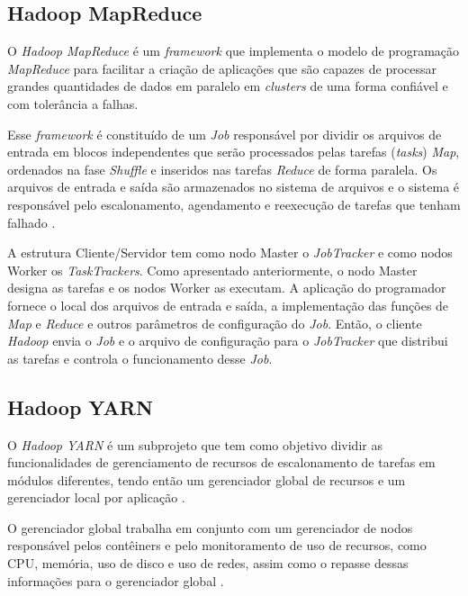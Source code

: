 \subsection{Hadoop MapReduce} \label{ssec:hadoopmapreduce}

O \textit{Hadoop MapReduce} é um \textit{\gls{framework}} que implementa o modelo de programação \textit{MapReduce} para facilitar a criação de aplicações que são capazes de processar grandes quantidades de dados em paralelo em \textit{clusters} de uma forma confiável e com tolerância a falhas. 

Esse \textit{\gls{framework}} é constituído de um \textit{Job} responsável por dividir os arquivos de entrada em blocos independentes que serão processados pelas tarefas (\textit{tasks}) \textit{Map}, ordenados na fase \textit{Shuffle} e inseridos nas tarefas \textit{Reduce} de forma paralela. Os arquivos de entrada e saída são armazenados no sistema de arquivos e o sistema é responsável pelo escalonamento, agendamento e reexecução de tarefas que tenham falhado \cite{HadoopMapReduce22}.

A estrutura Cliente/Servidor tem como nodo Master o \textit{JobTracker} e como nodos Worker os \textit{TaskTrackers}. Como apresentado anteriormente, o nodo Master designa as tarefas e os nodos Worker as executam. A aplicação do programador fornece o local dos arquivos de entrada e saída, a implementação das funções de \textit{Map} e \textit{Reduce} e outros parâmetros de configuração do \textit{Job}. Então, o cliente \textit{Hadoop} envia o \textit{Job} e o arquivo de configuração para o \textit{JobTracker} que distribui as tarefas e controla o funcionamento desse \textit{Job}.

\subsection{Hadoop YARN} \label{ssec:hadoopyarn}

O \textit{Hadoop YARN} é um subprojeto que tem como objetivo dividir as funcionalidades de gerenciamento de recursos de escalonamento de tarefas em módulos diferentes, tendo então um gerenciador global de recursos e um gerenciador local por aplicação \cite{GoldmanApache12}. 

O gerenciador global trabalha em conjunto com um gerenciador de nodos responsável pelos contêiners e pelo monitoramento de uso de recursos, como CPU, memória, uso de disco e uso de redes, assim como o repasse dessas informações para o gerenciador global \cite{HadoopYarn22}.

